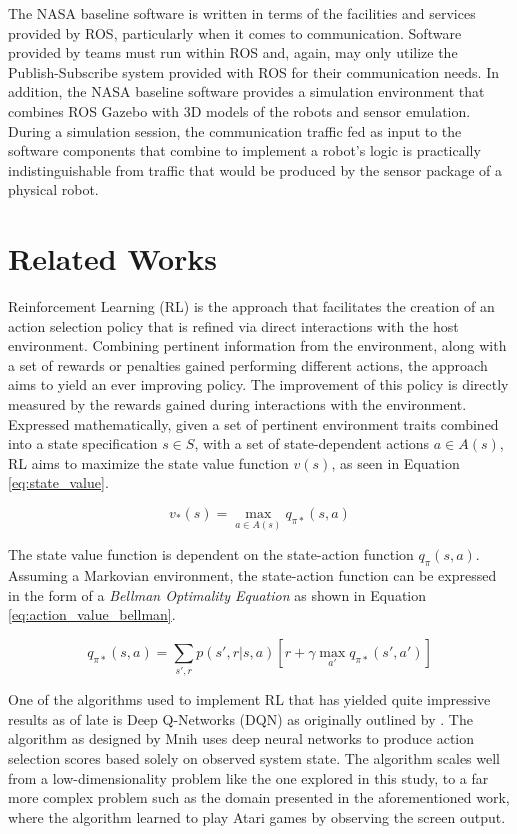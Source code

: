 \documentclass[sigconf,authordraft]{acmart}
\begin{document}
The NASA baseline software is written in terms of the facilities and services
provided by ROS, particularly when it comes to communication. Software provided
by teams must run within ROS and, again, may only utilize the Publish-Subscribe
system provided with ROS for their communication needs. In addition, the NASA
baseline software provides a simulation environment that combines ROS Gazebo
with 3D models of the robots and sensor emulation. During a simulation session,
the communication traffic fed as input to the software components that combine
to implement a robot's logic is practically indistinguishable from traffic that
would be produced by the sensor package of a physical robot.

\section{Related Works}\label{sec:related_works}
Reinforcement Learning (RL) is the approach that facilitates the creation of an action selection policy that is refined via direct interactions with the host environment. Combining pertinent information from the environment, along with a set of rewards or penalties gained performing different actions, the approach aims to yield an ever improving policy. The improvement of this policy is directly measured by the rewards gained during interactions with the environment. Expressed mathematically, given a set of pertinent environment traits combined into a state specification $s \in S$, with a set of state-dependent actions $a \in A(s)$, RL aims to maximize the state value function $v(s)$, as seen in Equation \ref{eq:state_value}.

\begin{equation}
  \label{eq:state_value}
  v_*(s) = \max_{a \in A(s)} q_{\pi *}(s, a)
\end{equation}

The state value function is dependent on the state-action function $q_\pi(s,a)$. Assuming a Markovian environment, the state-action function can be expressed in the form of a \textit{Bellman Optimality Equation} as shown in Equation \ref{eq:action_value_bellman}.

\begin{equation}
  \label{eq:action_value_bellman}
  q_{\pi *}(s, a) = \sum_{s', r} p(s', r | s, a) [r + \gamma \max_{a'}q_{\pi *}(s',a')]
\end{equation}

One of the algorithms used to implement RL that has yielded quite impressive results as of late is Deep Q-Networks (DQN) as originally outlined by \cite{mnih2015human}. The algorithm as designed by Mnih uses deep neural networks to produce action selection scores based solely on observed system state. The algorithm scales well from a low-dimensionality problem like the one explored in this study, to a far more complex problem such as the domain presented in the aforementioned work, where the algorithm learned to play Atari games by observing the screen output.
\end{document}
